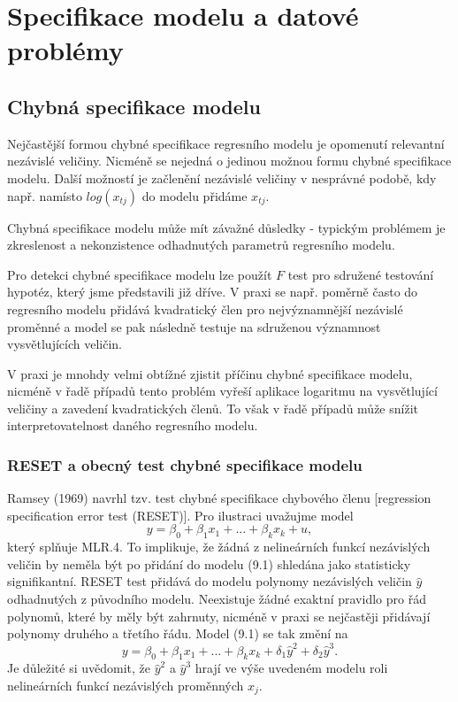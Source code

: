 \chapter{Specifikace modelu a datové problémy}

\section{Chybná specifikace modelu}

Nejčastější formou chybné specifikace regresního modelu je opomenutí relevantní nezávislé veličiny. Nicméně se nejedná o jedinou možnou formu chybné specifikace modelu. Další možností je začlenění nezávislé veličiny v nesprávné podobě, kdy např. namísto $log(x_{tj})$ do modelu přidáme $x_{tj}$.

Chybná specifikace modelu může mít závažné důsledky - typickým problémem je zkreslenost a nekonzistence odhadnutých parametrů regresního modelu.

Pro detekci chybné specifikace modelu lze použít $F$ test pro sdružené testování hypotéz, který jsme představili již dříve. V praxi se např. poměrně často do regresního modelu přidává kvadratický člen pro nejvýznamnější nezávislé proměnné a model se pak následně testuje na sdruženou významnost vysvětlujících veličin.

V praxi je mnohdy velmi obtížné zjistit příčinu chybné specifikace modelu, nicméně v řadě případů tento problém vyřeší aplikace logaritmu na vysvětlující veličiny a zavedení kvadratických členů. To však v řadě případů může snížit interpretovatelnost daného regresního modelu.

\subsection{RESET a obecný test chybné specifikace modelu}

Ramsey (1969) navrhl tzv. test chybné specifikace chybového členu [regression specification error test (RESET)]. Pro ilustraci uvažujme model
\begin{equation}
y = \beta_0 + \beta_1 x_1 + ... + \beta_k x_k + u,
\end{equation}
který splňuje MLR.4. To implikuje, že žádná z nelineárních funkcí nezávislých veličin by neměla být po přidání do modelu (9.1) shledána jako statisticky signifikantní. RESET test přidává do modelu polynomy nezávislých veličin $\hat{y}$ odhadnutých z původního modelu. Neexistuje žádné exaktní pravidlo pro řád polynomů, které by měly být zahrnuty, nicméně v praxi se nejčastěji přidávají polynomy druhého a třetího řádu. Model (9.1) se tak změní na
\begin{equation}
y = \beta_0 + \beta_1 x_1 + ... + \beta_k x_k + \delta_1 \hat{y}^2 + \delta_2 \hat{y}^3.
\end{equation}
Je důležité si uvědomit, že $\hat{y}^2$ a $\hat{y}^3$ hrají ve výše uvedeném modelu roli nelineárních funkcí nezávislých proměnných $x_j$.

